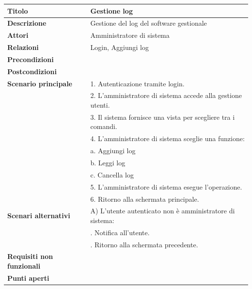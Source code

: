 \documentclass[a4paper]{article}
\begin{document}

  \begin{center}
    \begin{tabularx}{1\textwidth}{l|X}
        \textbf{Titolo} & Gestione log \\
        \hline
        \textbf{Descrizione} & Gestione del log del software gestionale \\
        \hline
        \textbf{Attori} & Amministratore di sistema \\
        \hline
        \textbf{Relazioni} & Login, Aggiungi log \\
        \hline
        \textbf{Precondizioni} &  \\
        \hline
        \textbf{Postcondizioni} &  \\
        \hline
        \textbf{Scenario principale} & 1. Autenticazione tramite login. \\
                                     & 2. L'amministratore di sistema accede alla gestione utenti. \\
                                     & 3. Il sistema fornisce una vista per scegliere tra i comandi. \\
                                     & 4. L'amministratore di sistema sceglie una funzione: \\
                                     & \quad a. Aggiungi log \\
                                     & \quad b. Leggi log \\
                                     & \quad c. Cancella log \\
                                     & 5. L'amministratore di sistema esegue l'operazione.\\
                                     & 6. Ritorno alla schermata principale.\\
        \hline
        \textbf{Scenari alternativi} & A) L'utente autenticato non è amministratore di sistema: \\
                                     & \quad 1. Notifica all'utente.\\
                                     & \quad 2. Ritorno alla schermata precedente.\\
        \hline
        \textbf{Requisiti non funzionali} & \\
        \hline
        \textbf{Punti aperti} & \\
        \hline
    \end{tabularx}
  \end{center}
\end{document}
